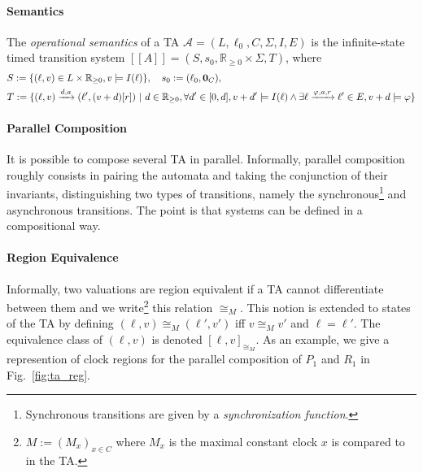 \documentclass[11pt]{article}
\theoremstyle{definition}
\theoremstyle{remark}
\theoremstyle{definition}
\begin{document}
\paragraph{Semantics}\label{par:semantics}
The \emph{operational semantics} of a TA $\mathcal{A} = (L, \ell_0, C, \Sigma, I, E)$ is the infinite-state timed transition system $[\![A]\!] = (S, s_0, \mathbb{R}_{\geq 0} \times \Sigma, T)$, where
\begin{align*}
	&S := \{(\ell, v) \in L \times \mathbb{R}_{\geq 0}, v \models I(\ell)\}, \quad s_0 := (\ell_0, \text{\bf 0}_C),\\
	&T := \{(\ell, v) \xrightarrow{d, a} (\ell', (v+d)[r]) \ | \ d \in \mathbb{R}_{\geq 0}, \forall d' \in [0, d], v + d' \models I(\ell) \land \exists \ell \xrightarrow{\varphi, a, r} \ell' \in E, v + d \models \varphi \}
\end{align*}


\paragraph{Parallel Composition}\label{par:ta_parcomp}
It is possible to compose several TA in parallel. Informally, parallel composition roughly consists in pairing the automata and taking the conjunction of their invariants, distinguishing two types of transitions, namely the synchronous\footnote{Synchronous transitions are given by a \emph{synchronization function}.} and asynchronous transitions. The point is that systems can be defined in a compositional way.

\paragraph{Region Equivalence}\label{par:ta_regeq}
Informally, two valuations are region equivalent if a TA cannot differentiate between them and we write\footnote{$M := (M_x)_{x \in C}$ where $M_x$ is the maximal constant clock $x$ is compared to in the TA.} this relation $\cong_M$. This notion is extended to states of the TA by defining $(\ell, v) \cong_M (\ell', v')$ iff $v \cong_M v'$ and $\ell = \ell'$. The equivalence class of $(\ell, v)$ is denoted $[\ell, v]_{\cong_M}$.
As an example, we give a represention of clock regions for the parallel composition of $P_1$ and $R_1$ in Fig.~\ref{fig:ta_reg}.
\end{document}
